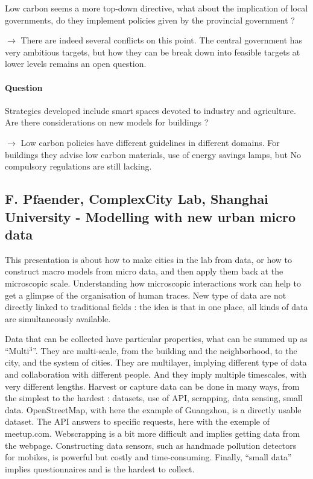 \documentclass[10pt]{article}
\begin{document}
Low carbon seems a more top-down directive, what about the implication of local governments, do they implement policies given by the provincial government ?

$\rightarrow$ There are indeed several conflicts on this point. The central government has very ambitious targets, but how they can be break down into feasible targets at lower levels remains an open question.


\paragraph{Question}

Strategies developed include smart spaces devoted to industry and agriculture. Are there considerations on new models for buildings ?

$\rightarrow$ Low carbon policies have different guidelines in different domains. For buildings they advise low carbon materials, use of energy savings lamps, but No compulsory regulations are still lacking.





\subsection*{F. Pfaender, ComplexCity Lab, Shanghai University - Modelling with new urban micro data}

This presentation is about how to make cities in the lab from data, or how to construct macro models from micro data, and then apply them back at the microscopic scale. Understanding how microscopic interactions work can help to get a glimpse of the organisation of human traces. New type of data are not directly linked to traditional fields : the idea is that in one place, all kinds of data are simultaneously available.

Data that can be collected have particular properties, what can be summed up as ``Multi$^3$''. They are multi-scale, from the building and the neighborhood, to the city, and the system of cities. They are multilayer, implying different type of data and collaboration with different people. And they imply multiple timescales, with very different lengths. Harvest or capture data can be done in many ways, from the simplest to the hardest : datasets, use of API, scrapping, data sensing, small data. OpenStreetMap, with here the example of Guangzhou, is a directly usable dataset. The API answers to specific requests, here with the exemple of meetup.com. Webscrapping is a bit more difficult and implies getting data from the webpage. Constructing data sensors, such as handmade pollution detectors for mobikes, is powerful but costly and time-consuming. Finally, ``small data'' implies questionnaires and is the hardest to collect.
\end{document}

